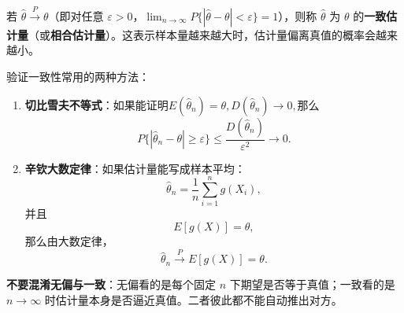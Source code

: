 \documentclass[lang=cn,11pt]{elegantbook}
\begin{document}
\begin{definition} \label{def:consistent}
若 \(\hat{\theta}\xrightarrow{P}\theta\)（即对任意 \(\varepsilon > 0\)，\(\lim_{n\to\infty}P\{|\hat{\theta}-\theta| < \varepsilon\} = 1\)），则称 \(\hat{\theta}\) 为 \(\theta\) 的\textbf{一致估计量}（或\textbf{相合估计量}）。这表示样本量越来越大时，估计量偏离真值的概率会越来越小。
\end{definition}

\begin{note}
验证一致性常用的两种方法：
\begin{enumerate}
    \item \textbf{切比雪夫不等式}：如果能证明\(E(\hat\theta_n)=\theta,\)\(D(\hat\theta_n)\to0,\)那么
\[
P\{|\hat\theta_n-\theta|\ge\varepsilon\}
\le
\frac{D(\hat\theta_n)}{\varepsilon^2}
\to0.
\]
    \item \textbf{辛钦大数定律}：如果估计量能写成样本平均：
\[
\hat\theta_n=\frac1n\sum_{i=1}^n g(X_i),
\]并且
\[
E[g(X)]=\theta,
\]那么由大数定律，
\[
\hat\theta_n\xrightarrow{P}E[g(X)]=\theta.
\]
\end{enumerate}
\textbf{不要混淆无偏与一致}：无偏看的是每个固定 \(n\) 下期望是否等于真值；一致看的是 \(n\to\infty\) 时估计量本身是否逼近真值。二者彼此都不能自动推出对方。
\end{note}
\end{document}
